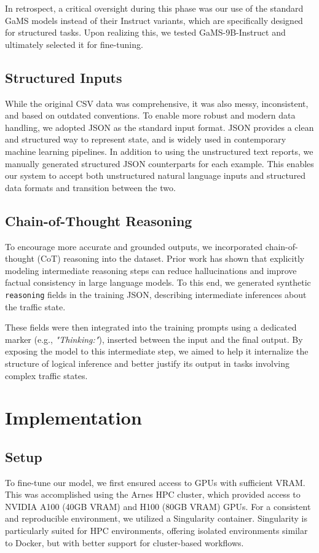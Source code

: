 \documentclass[fleqn,moreauthors,10pt]{ds_report}
\begin{document}
In retrospect, a critical oversight during this phase was our use of the standard GaMS models instead of their Instruct variants, which are specifically designed for structured tasks. Upon realizing this, we tested GaMS-9B-Instruct and ultimately selected it for fine-tuning.

\subsection*{Structured Inputs}

While the original CSV data was comprehensive, it was also messy, inconsistent, and based on outdated conventions. To enable more robust and modern data handling, we adopted JSON as the standard input format. JSON provides a clean and structured way to represent state, and is widely used in contemporary machine learning pipelines. In addition to using the unstructured text reports, we manually generated structured JSON counterparts for each example. This enables our system to accept both unstructured natural language inputs and structured data formats and transition between the two.

\subsection*{Chain-of-Thought Reasoning}

To encourage more accurate and grounded outputs, we incorporated chain-of-thought (CoT) reasoning into the dataset. Prior work has shown that explicitly modeling intermediate reasoning steps can reduce hallucinations and improve factual consistency in large language models. To this end, we generated synthetic \texttt{reasoning} fields in the training JSON, describing intermediate inferences about the traffic state.

These fields were then integrated into the training prompts using a dedicated marker (e.g.,  \textit{"Thinking:"}), inserted between the input and the final output. By exposing the model to this intermediate step, we aimed to help it internalize the structure of logical inference and better justify its output in tasks involving complex traffic states.

\section*{Implementation}
\subsection*{Setup}
To fine-tune our model, we first ensured access to GPUs with sufficient VRAM. This was accomplished using the Arnes HPC cluster, which provided access to NVIDIA A100 (40GB VRAM) and H100 (80GB VRAM) GPUs. For a consistent and reproducible environment, we utilized a Singularity container. Singularity is particularly suited for HPC environments, offering isolated environments similar to Docker, but with better support for cluster-based workflows.
\end{document}
